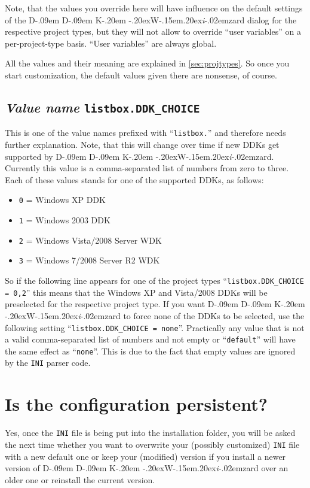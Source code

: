 \documentclass[a4paper,titlepage]{report}
\def\ddkwiz{D\kern-.09em D\kern-.09em K\kern-.20em \raise-.20ex\hbox{W}\kern-.15em\raise.20ex\hbox{\it{i}}\kern-.02em{zard}}
\begin{document}
Note, that the values you override here will have influence on the default settings
of the \ddkwiz{} dialog for the respective project types, but they will not allow
to override ``user variables'' on a per-project-type basis. ``User variables'' are
always global.

All the values and their meaning are explained in \autoref{sec:projtypes}.
So once you start customization, the default values given there are nonsense,
of course.

\subsection{\emph{Value name} \texttt{listbox.DDK\_CHOICE}}
\label{sec:ddkchoice}
This is one of the value names prefixed with ``\texttt{listbox.}'' and therefore
needs further explanation. Note, that this will change over time if new DDKs get
supported by \ddkwiz{}.\\

Currently this value is a comma-separated list of numbers from zero to three.
Each of these values stands for one of the supported DDKs, as follows:

\begin{itemize}
  \item \texttt{0} = Windows XP DDK
  \item \texttt{1} = Windows 2003 DDK
  \item \texttt{2} = Windows Vista/2008 Server WDK
  \item \texttt{3} = Windows 7/2008 Server R2 WDK
\end{itemize}

So if the following line appears for one of the project types ``\verb+listbox.DDK_CHOICE = 0,2+''
this means that the Windows XP and Vista/2008 DDKs will be preselected for the respective
project type. If you want \ddkwiz{} to force none of the DDKs to be selected,
use the following setting ``\verb+listbox.DDK_CHOICE = none+''. Practically any value
that is not a valid comma-separated list of numbers and not empty or ``\texttt{default}''
will have the same effect as ``\texttt{none}''. This is due to the fact that empty
values are ignored by the \texttt{INI} parser code.

\section{Is the configuration persistent?}
\label{sec:persistentcfg}
Yes, once the \texttt{INI} file is being put into the installation folder, you will be asked
the next time whether you want to overwrite your (possibly customized) \texttt{INI} file with
a new default one or keep your (modified) version if you install a newer version of
\ddkwiz{} over an older one or reinstall the current version.
\end{document}
